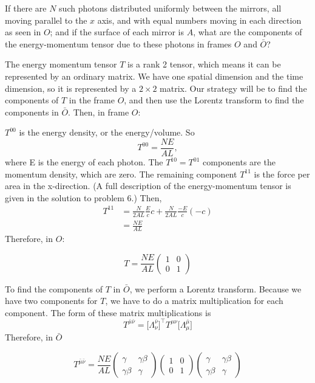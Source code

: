 \documentclass[11pt,largemargins]{homework}
\begin{document}
\begin{alphaparts}
\questionpart
If there are $N$ such photons distributed uniformly between the mirrors, all moving parallel to the $x$ axis, and with equal numbers moving in each direction as seen in $O$; and if the surface of each mirror is $A$, what are the components of the energy-momentum tensor due to these photons in frames $O$ and $\bar{O}$?

The energy momentum tensor $T$ is a rank 2 tensor, which means it can be represented by an ordinary matrix.  We have one spatial dimension and the time dimension, so it is represented by a $2 \times 2$ matrix.  Our strategy will be to find the components of $T$ in the frame $O$, and then use the Lorentz transform to find the components in $\bar{O}$. Then, in frame $O$: 

$T^{00}$ is the energy density, or the energy/volume.  So 
$$T^{00} = \frac{NE}{AL},$$ where E is the energy of each photon.  The $T^{10} = T^{01}$ components are the momentum density, which are zero.  The remaining component $T^{11}$ is the force per area in the x-direction.  (A full description of the energy-momentum tensor is given in the solution to problem 6.) Then,
\begin{subequations}
\begin{align*}
T^{11} &= \frac{N}{2AL} \frac{E}{c} c + \frac{N}{2AL} \frac{-E}{c} (-c) \\
&= \frac{NE}{AL}
\end{align*}
\end{subequations}
Therefore, in $O$:

\begin{equation}
T = \frac{NE}{AL} \begin{pmatrix} 1 & 0 \\ 0 & 1 \end{pmatrix}
\end{equation}

To find the components of $T$ in $\bar{O}$, we perform a Lorentz transform.  Because we have two components for $T$, we have to do a matrix multiplication for each component.  The form of these matrix multiplications is
\begin{equation}
T^{\bar{\mu}\bar{\nu}} = \big[ \Lambda_{\nu}^{\bar{\nu}} \big]^{\top} T^{\mu \nu} \big[ \Lambda_{\mu}^{\bar{\mu}} \big]
\end{equation}
Therefore, in $\bar{O}$

\begin{equation*}
T^{\bar{\mu} \bar{\nu}} = \frac{NE}{AL} \begin{pmatrix} \gamma & \gamma \beta \\ \gamma \beta & \gamma \end{pmatrix} \begin{pmatrix} 1 & 0 \\ 0 & 1 \end{pmatrix} \begin{pmatrix} \gamma & \gamma \beta \\ \gamma \beta & \gamma \end{pmatrix} 
\end{equation*}


\end{alphaparts}
\end{document}
